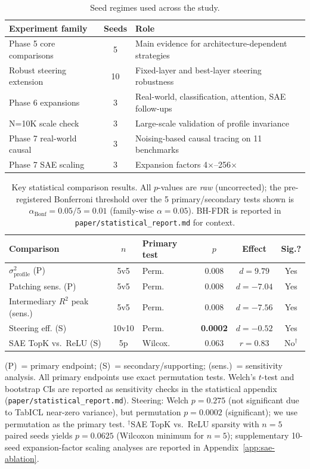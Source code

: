 \documentclass{article}
\begin{document}
\begin{table}[t]
\centering
\caption{Seed regimes used across the study.}
\label{tab:seed-regimes}
\small
\begin{tabular}{@{}l c l@{}}
\toprule
Experiment family & Seeds & Role \\
\midrule
Phase 5 core comparisons & 5 & Main evidence for architecture-dependent strategies \\
Robust steering extension & 10 & Fixed-layer and best-layer steering robustness \\
Phase 6 expansions & 3 & Real-world, classification, attention, SAE follow-ups \\
N=10K scale check & 3 & Large-scale validation of profile invariance \\
Phase 7 real-world causal & 3 & Noising-based causal tracing on 11 benchmarks \\
Phase 7 SAE scaling & 3 & Expansion factors 4$\times$--256$\times$ \\
\bottomrule
\end{tabular}
\end{table}

\begin{table}[t]
\centering
\caption{Key statistical comparison results. All $p$-values are \emph{raw} (uncorrected); the pre-registered Bonferroni threshold over the 5 primary/secondary tests shown is $\alpha_{\text{Bonf}} = 0.05/5 = 0.01$ (family-wise $\alpha=0.05$). BH-FDR is reported in \texttt{paper/statistical\_report.md} for context.}
\label{tab:stats}
\small
\begin{tabular}{@{}l c l c c c@{}}
\toprule
Comparison & $n$ & Primary test & $p$ & Effect & Sig.? \\
\midrule
$\sigma^2_\text{profile}$ (P) & 5v5 & Perm. & 0.008 & $d{=}9.79$ & Yes \\
Patching sens. (P) & 5v5 & Perm. & 0.008 & $d{=}{-}7.04$ & Yes \\
Intermediary $R^2$ peak (sens.) & 5v5 & Perm. & 0.008 & $d{=}{-}7.56$ & Yes \\
Steering eff. (S) & 10v10 & Perm. & \textbf{0.0002} & $d{=}{-}0.52$ & Yes \\
SAE TopK vs.\ ReLU (S) & 5p & Wilcox. & 0.063 & $r{=}0.83$ & No$^{\dagger}$ \\
\bottomrule
\end{tabular}
\end{table}

(P)~= primary endpoint; (S)~= secondary/supporting; (sens.)~= sensitivity analysis. All primary endpoints use exact permutation tests. Welch's $t$-test and bootstrap CIs are reported as sensitivity checks in the statistical appendix (\texttt{paper/statistical\_report.md}). Steering: Welch $p = 0.275$ (not significant due to TabICL near-zero variance), but permutation $p = 0.0002$ (significant); we use permutation as the primary test. $^{\dagger}$SAE TopK vs.\ ReLU sparsity with $n{=}5$ paired seeds yields $p{=}0.0625$ (Wilcoxon minimum for $n{=}5$); supplementary 10-seed expansion-factor scaling analyses are reported in Appendix~\ref{app:sae-ablation}.
\end{document}
